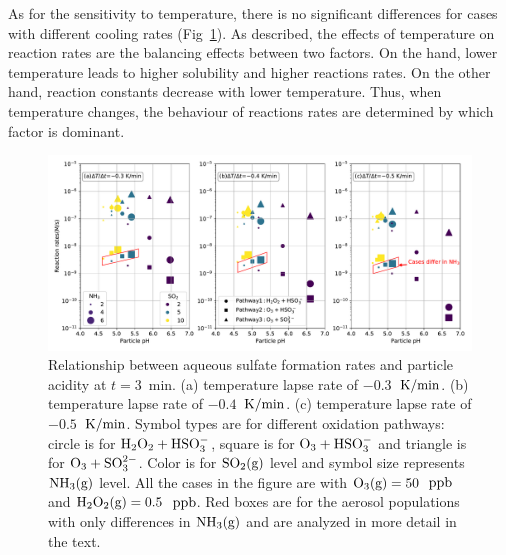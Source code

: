 \documentclass[edeposit,fullpage]{uiucthesis2009}
\makeatletter
\DeclareRobustCommand*\unit[1]
 {\ensuremath{%
   {\thinmuskip3mu\relax
    \def\mu{\text{\textmu}}\def~{\,}%
    \ifx\f@series\testbx\mathbf{#1}\else\mathrm{#1}\fi}}}
\makeatother
\begin{document}
As for the sensitivity to temperature, there is no significant
differences for cases with different cooling rates
(Fig~\ref{chap2:reac-rates}). As \citet{Seinfeld2016} described, the
effects of temperature on reaction rates are the balancing effects
between two factors. On the hand, lower temperature leads to higher
solubility and higher reactions rates. On the other hand, reaction
constants decrease with lower temperature. Thus, when temperature
changes, the behaviour of reactions rates are determined by which
factor is dominant. 

\begin{figure}[ht]
    \centering \includegraphics[scale=0.53]{chap2_figs/chap2_fig6_sulfate_pH.pdf}
    \caption{Relationship between aqueous sulfate formation rates and
      particle acidity at $t=3$~min. (a) temperature lapse rate of
      $-0.3$~\unit{K/min}. (b) temperature lapse rate of
      $-0.4$~\unit{K/min}. (c) temperature lapse rate of
      $-0.5$~\unit{K/min}. Symbol types are for different oxidation
      pathways: circle is for $\rm H_2O_2+ HSO_3^-$, square is for
      $\rm O_3+ HSO_3^-$ and triangle is for $\rm O_3+
      SO_3^{2-}$. Color is for $\rm SO_2(g)$ level and symbol size
      represents $\rm NH_3(g)$ level. All the cases in the figure are
      with $\rm O_3(g) = 50$~\unit{ppb} and $\rm H_2O_2(g) =
      0.5$~\unit{ppb}. Red boxes are for the aerosol populations with
      only differences in $\rm NH_3(g)$ and are analyzed in more
      detail in the text.}
    \label{chap2:reac-rates}
\end{figure}
\end{document}
